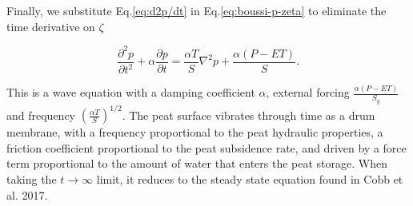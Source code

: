 \documentclass[10pt]{article}
\begin{document}
Finally, we substitute Eq.\eqref{eq:d2p/dt} in Eq.\eqref{eq:boussi-p-zeta} to eliminate the time derivative on $\zeta$

$$
\frac{\partial^2 p}{\partial t^2} + \alpha \frac{\partial p}{\partial t} = \frac{\alpha T}{S}\nabla^2 p + \frac{\alpha (P-ET)}{S}.
$$

This is a wave equation with a damping coefficient $\alpha$, external forcing $\frac{\alpha (P-ET)}{S_y}$ and frequency $\left(\frac{\alpha T}{S}\right)^{1/2}$.
The peat surface vibrates through time as a drum membrane, with a frequency proportional to the peat hydraulic properties, a friction coefficient proportional to the peat subsidence rate, and driven by a force term proportional to the amount of water that enters the peat storage.
When taking the $t\rightarrow \infty$ limit, it reduces to the steady state equation found in Cobb et al. 2017.
\end{document}
